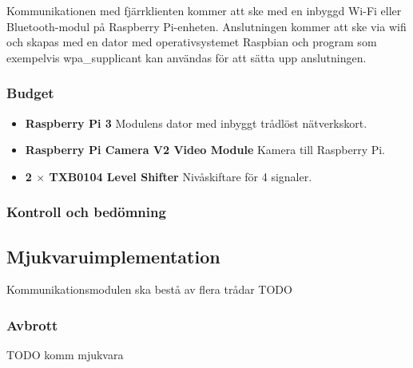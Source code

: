 \documentclass[designspec/spec.tex]{subfiles}
\begin{document}
Kommunikationen med fjärrklienten kommer att ske med en inbyggd Wi-Fi eller
Bluetooth-modul på Raspberry Pi-enheten. Anslutningen kommer att ske via wifi
och skapas med en dator med operativsystemet Raspbian och program som
exempelvis wpa\_supplicant kan användas för att sätta upp anslutningen.

\subsubsection{Budget}
\begin{itemize}
    \item \textbf{Raspberry Pi 3} Modulens dator med inbyggt trådlöst
    nätverkskort.
    \item \textbf{Raspberry Pi Camera V2 Video Module} Kamera till Raspberry
    Pi.
    \item \textbf{2 $\times$ TXB0104 Level Shifter} Nivåskiftare för 4
    signaler.
\end{itemize}

\subsubsection{Kontroll och bedömning}

\subsection{Mjukvaruimplementation}
Kommunikationsmodulen ska bestå av flera trådar TODO

\subsubsection{Avbrott}

TODO komm mjukvara
\end{document}
